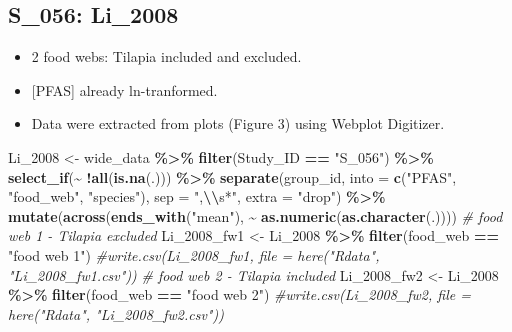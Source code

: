 \documentclass[
]{article}
\newenvironment{Shaded}{\begin{snugshade}}{\end{snugshade}}
\newcommand{\AttributeTok}[1]{\textcolor[rgb]{0.13,0.29,0.53}{#1}}
\newcommand{\CommentTok}[1]{\textcolor[rgb]{0.56,0.35,0.01}{\textit{#1}}}
\newcommand{\FunctionTok}[1]{\textcolor[rgb]{0.13,0.29,0.53}{\textbf{#1}}}
\newcommand{\NormalTok}[1]{#1}
\newcommand{\OtherTok}[1]{\textcolor[rgb]{0.56,0.35,0.01}{#1}}
\newcommand{\SpecialCharTok}[1]{\textcolor[rgb]{0.81,0.36,0.00}{\textbf{#1}}}
\newcommand{\StringTok}[1]{\textcolor[rgb]{0.31,0.60,0.02}{#1}}
\providecommand{\tightlist}{%
  \setlength{\itemsep}{0pt}\setlength{\parskip}{0pt}}
\begin{document}
\subsection{S\_056: Li\_2008}\label{s_056-li_2008}

\begin{itemize}
\tightlist
\item
  2 food webs: Tilapia included and excluded.
\item
  {[}PFAS{]} already ln-tranformed.
\item
  Data were extracted from plots (Figure 3) using Webplot Digitizer.
\end{itemize}

\begin{Shaded}
\begin{Highlighting}[]
\NormalTok{Li\_2008 }\OtherTok{\textless{}{-}}\NormalTok{ wide\_data }\SpecialCharTok{\%\textgreater{}\%} 
  \FunctionTok{filter}\NormalTok{(Study\_ID }\SpecialCharTok{==} \StringTok{"S\_056"}\NormalTok{) }\SpecialCharTok{\%\textgreater{}\%}
  \FunctionTok{select\_if}\NormalTok{(}\SpecialCharTok{\textasciitilde{}} \SpecialCharTok{!}\FunctionTok{all}\NormalTok{(}\FunctionTok{is.na}\NormalTok{(.))) }\SpecialCharTok{\%\textgreater{}\%} 
  \FunctionTok{separate}\NormalTok{(group\_id, }\AttributeTok{into =} \FunctionTok{c}\NormalTok{(}\StringTok{"PFAS"}\NormalTok{, }\StringTok{"food\_web"}\NormalTok{, }\StringTok{"species"}\NormalTok{), }\AttributeTok{sep =} \StringTok{",}\SpecialCharTok{\textbackslash{}\textbackslash{}}\StringTok{s*"}\NormalTok{, }\AttributeTok{extra =} \StringTok{"drop"}\NormalTok{) }\SpecialCharTok{\%\textgreater{}\%} 
  \FunctionTok{mutate}\NormalTok{(}\FunctionTok{across}\NormalTok{(}\FunctionTok{ends\_with}\NormalTok{(}\StringTok{"mean"}\NormalTok{), }\SpecialCharTok{\textasciitilde{}} \FunctionTok{as.numeric}\NormalTok{(}\FunctionTok{as.character}\NormalTok{(.))))}
\CommentTok{\# food web 1 {-} Tilapia excluded}
\NormalTok{Li\_2008\_fw1 }\OtherTok{\textless{}{-}}\NormalTok{ Li\_2008 }\SpecialCharTok{\%\textgreater{}\%} 
  \FunctionTok{filter}\NormalTok{(food\_web }\SpecialCharTok{==} \StringTok{"food web 1"}\NormalTok{)}
\CommentTok{\#write.csv(Li\_2008\_fw1, file = here("Rdata", "Li\_2008\_fw1.csv"))}
\CommentTok{\# food web 2 {-} Tilapia included}
\NormalTok{Li\_2008\_fw2 }\OtherTok{\textless{}{-}}\NormalTok{ Li\_2008 }\SpecialCharTok{\%\textgreater{}\%} 
  \FunctionTok{filter}\NormalTok{(food\_web }\SpecialCharTok{==} \StringTok{"food web 2"}\NormalTok{)}
\CommentTok{\#write.csv(Li\_2008\_fw2, file = here("Rdata", "Li\_2008\_fw2.csv"))}
\end{Highlighting}
\end{Shaded}
\end{document}
